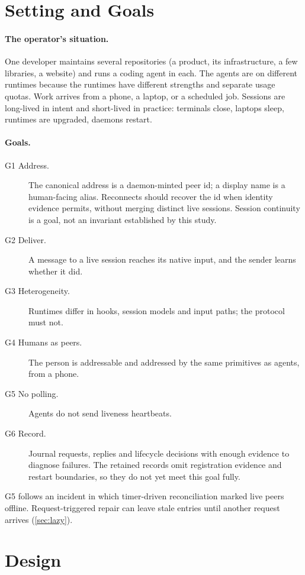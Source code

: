 \documentclass[10pt,twocolumn]{article}
\begin{document}
\section{Setting and Goals}
\label{sec:setting}

\paragraph{The operator's situation.}
One developer maintains several repositories (a product, its infrastructure, a few libraries, a website) and runs a coding agent in each. The agents are on different runtimes because the runtimes have different strengths and separate usage quotas. Work arrives from a phone, a laptop, or a scheduled job. Sessions are long-lived in intent and short-lived in practice: terminals close, laptops sleep, runtimes are upgraded, daemons restart.

\paragraph{Goals.}
\begin{description}
\item[G1 Address.] The canonical address is a daemon-minted peer id; a display name is a human-facing alias. Reconnects should recover the id when identity evidence permits, without merging distinct live sessions. Session continuity is a goal, not an invariant established by this study.
\item[G2 Deliver.] A message to a live session reaches its native input, and the sender learns whether it did.
\item[G3 Heterogeneity.] Runtimes differ in hooks, session models and input paths; the protocol must not.
\item[G4 Humans as peers.] The person is addressable and addressed by the same primitives as agents, from a phone.
\item[G5 No polling.] Agents do not send liveness heartbeats.
\item[G6 Record.] Journal requests, replies and lifecycle decisions with enough evidence to diagnose failures. The retained records omit registration evidence and restart boundaries, so they do not yet meet this goal fully.
\end{description}
G5 follows an incident in which timer-driven reconciliation marked live peers offline. Request-triggered repair can leave stale entries until another request arrives (\cref{sec:lazy}).

\section{Design}
\label{sec:design}
\end{document}

